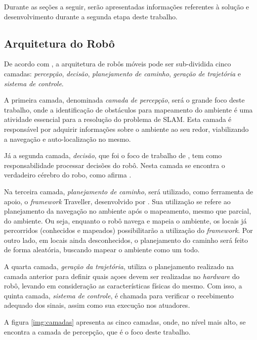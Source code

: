	Durante as seções a seguir, serão apresentadas informações referentes à solução e desenvolvimento durante a segunda etapa deste trabalho.

	\subsection{Arquitetura do Robô} %
	\label{sub:arquitetura_do_robô}
		
		De acordo com \cite{vieira}, a arquitetura de robôs móveis pode ser sub-dividida cinco camadas: \textit{percepção}, \textit{decisão}, \textit{planejamento de caminho}, \textit{geração de trajetória} e \textit{sistema de controle}.

		A primeira camada, denominada \textit{camada de percepção}, será o grande foco deste trabalho, onde a identificação de obstáculos para mapeamento do ambiente é uma atividade essencial para a resolução do problema de SLAM. Esta camada é responsável por adquirir informações sobre o ambiente ao seu redor, viabilizando a navegação e auto-localização no mesmo.

		Já a segunda camada, \textit{decisão}, que foi o foco de trabalho de \cite{tccCarol}, tem como responsabilidade processar decisões do robô. Nesta camada se encontra o verdadeiro cérebro do robo, como afirma \cite{vieira}.

		Na terceira camada, \textit{planejamento de caminho}, será utilizado, como ferramenta de apoio, o \textit{framework} Traveller, desenvolvido por \cite{tccRodrigo}. Sua utilização se refere ao planejamento da navegação no ambiente após o mapeamento, mesmo que parcial, do ambiente. Ou seja, enquanto o robô navega e mapeia o ambiente, os locais já percorridos (conhecidos e mapeados) possibilitarão a utilização do \textit{framework}. Por outro lado, em locais ainda desconhecidos, o planejamento do caminho será feito de forma aleatória, buscando mapear o ambiente como um todo.

		A quarta camada, \textit{geração da trajetória}, utiliza o planejamento realizado na camada anterior para definir quais açoes devem ser realizadas no \textit{hardware} do robô, levando em consideração as características físicas do mesmo. Com isso, a quinta camada, \textit{sistema de controle}, é chamada para verificar o recebimento adequado dos sinais, assim como sua execução nos atuadores. 

		A figura \ref{img:camadas} apresenta as cinco camadas, onde, no nível mais alto, se encontra a camada de percepção, que é o foco deste trabalho. 

